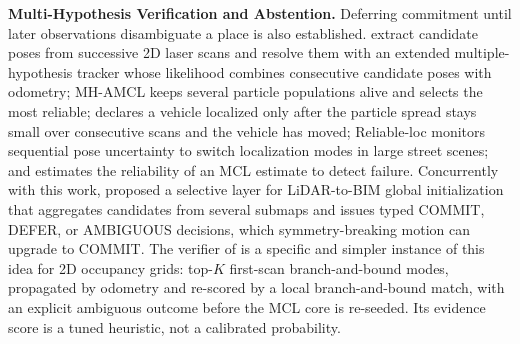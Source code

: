 \noindent\textbf{Multi-Hypothesis Verification and Abstention.}
Deferring commitment until later observations disambiguate a place is also established. \citet{gao2019global} extract candidate poses from successive 2D laser scans and resolve them with an extended multiple-hypothesis tracker whose likelihood combines consecutive candidate poses with odometry; MH-AMCL \citep{garcia2023mhamcl} keeps several particle populations alive and selects the most reliable; \citet{adurthi2023scan} declares a vehicle localized only after the particle spread stays small over consecutive scans and the vehicle has moved; Reliable-loc \citep{zou2024reliableloc} monitors sequential pose uncertainty to switch localization modes in large street scenes; and \citet{akai2023reliable} estimates the reliability of an MCL estimate to detect failure. Concurrently with this work, \citet{zhang2026movefirst} proposed a selective layer for LiDAR-to-BIM global initialization that aggregates candidates from several submaps and issues typed COMMIT, DEFER, or AMBIGUOUS decisions, which symmetry-breaking motion can upgrade to COMMIT. The verifier of  is a specific and simpler instance of this idea for 2D occupancy grids: top-$K$ first-scan branch-and-bound modes, propagated by odometry and re-scored by a local branch-and-bound match, with an explicit ambiguous outcome before the MCL core is re-seeded. Its evidence score is a tuned heuristic, not a calibrated probability.



